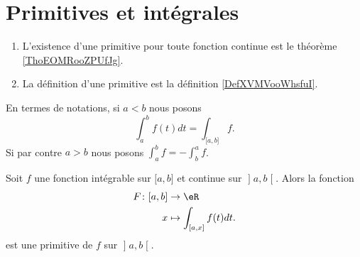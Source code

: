 
\section{Primitives et intégrales}

\begin{enumerate}
    \item
        L'existence d'une primitive pour toute fonction continue est le théorème \ref{ThoEOMRooZPUfJg}.
    \item
        La définition d'une primitive est la définition \ref{DefXVMVooWhsfuI}.
\end{enumerate}

En termes de notations, si \( a<b\) nous posons
\begin{equation}
    \int_a^bf(t)dt=\int_{\mathopen[ a , b \mathclose]}f.
\end{equation}
Si par contre \( a>b\) nous posons \( \int_a^bf=-\int_b^af\).

\begin{proposition} \label{PropEZFRsMj}
    Soit \( f\) une fonction intégrable sur \( \mathopen[ a , b \mathclose]\) et continue sur \( \mathopen] a , b \mathclose[\). Alors la fonction
    \begin{equation}
        \begin{aligned}
            F\colon \mathopen[ a , b \mathclose]&\to \eR \\
            x&\mapsto \int_{\mathopen[ a , x \mathclose]}f(t)dt.
        \end{aligned}
    \end{equation}
est une primitive de \( f\) sur \( \mathopen] a , b \mathclose[\).
\end{proposition}

